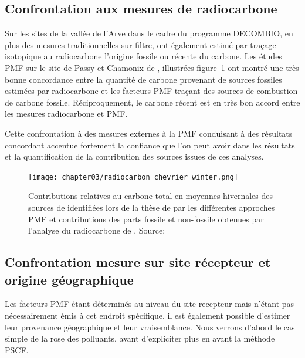 \subsection{Confrontation aux mesures de radiocarbone }%
\label{sub:14c}

Sur les sites de la vallée de l'Arve dans le cadre du programme DECOMBIO, en plus des mesures
traditionnelles sur filtre, \textcite{bonvalotEstimating2016} ont également estimé par
traçage isotopique au radiocarbone  l'origine fossile ou récente du carbone.
Les études PMF sur le site de Passy et Chamonix de \textcite{chevrierChauffage2016},
illustrées figure~\ref{fig:chapter03/radiocarbon_chevrier_winter} ont
montré une très bonne concordance entre la quantité de carbone provenant de sources
fossiles estimées par radiocarbone et les facteurs PMF traçant des sources de combustion de
carbone fossile. Réciproquement, le carbone récent est en très bon accord entre les mesures
radiocarbone et PMF.

Cette confrontation à des mesures externes à la PMF conduisant à des résultats concordant
accentue fortement la confiance que l'on peut avoir dans les résultats et la
quantification de la contribution des sources issues de ces analyses.

\begin{figure}[ht]
    \centering
    \texttt{[image: chapter03/radiocarbon\_chevrier\_winter.png]}
    \caption{Contributions relatives au carbone total en moyennes hivernales des sources
        de \PMdix{} identifiées lors de la thèse de \textcite{chevrierChauffage2016} par les
        différentes approches PMF et contributions des parts fossile et non-fossile
        obtenues par l’analyse du radiocarbone de \textcite{bonvalotEstimating2016}.
    Source: \textcite[figure 75]{chevrierChauffage2016}}%
    \label{fig:chapter03/radiocarbon_chevrier_winter}
\end{figure}

\subsection{Confrontation mesure sur site récepteur et origine géographique}%
\label{sub:confrontation_mesure_sur_site_recepteur_et_origine_geographique}

Les facteurs PMF étant déterminés au niveau du site recepteur mais n'étant pas
nécessairement émis à cet endroit spécifique, il est également possible d'estimer leur
provenance géographique et leur vraisemblance. Nous verrons d'abord le cas simple de la
rose des polluants, avant d'expliciter plus en avant la méthode PSCF.

